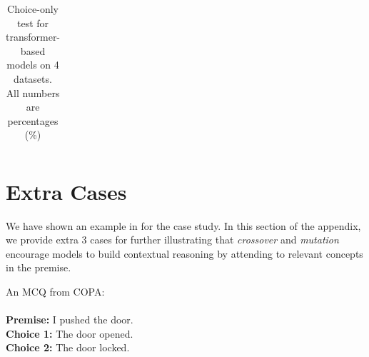 \begin{table}[th]
\begin{tabular}{c|rrrr}
\bottomrule
\end{tabular}
\caption{Choice-only test for transformer-based models on 4 datasets. All numbers are percentages (\%)}
\label{tab:only-test}
\end{table}

\section{Extra Cases}
We have shown an example in  for the case study. In this section of the appendix, we 
provide extra 3 cases for further illustrating that \textit{crossover} and \textit{mutation} 
encourage models to build contextual reasoning  
by attending to relevant concepts in the premise. 

\begin{example}\label{ex:copa1}
An MCQ from COPA:\\ \\
\noindent
\textbf{Premise:} I pushed the door. \\
\textbf{Choice 1:} The door opened.  \checksymbol  \\
\textbf{Choice 2:} The door locked. \crosssymbol
\end{example}

